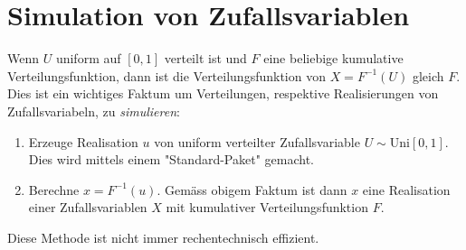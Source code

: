 \section{Simulation von Zufallsvariablen}
Wenn $U$ uniform auf $[0,1]$ verteilt ist und $F$ eine beliebige kumulative Verteilungsfunktion, dann ist die Verteilungsfunktion von $X=F^{-1}(U)$ gleich $F$. Dies ist ein wichtiges Faktum um Verteilungen, respektive Realisierungen von Zufallsvariabeln, zu \emph{simulieren}:
\begin{enumerate}[1.]
	\item Erzeuge Realisation $u$ von uniform verteilter Zufallsvariable $U\sim\text{Uni}[0,1]$. Dies wird mittels einem "Standard-Paket" gemacht.
	\item Berechne $x=F^{-1}(u)$. Gemäss obigem Faktum ist dann $x$ eine Realisation einer Zufallsvariablen $X$ mit kumulativer Verteilungsfunktion $F$.
\end{enumerate}
Diese Methode ist nicht immer rechentechnisch effizient.
